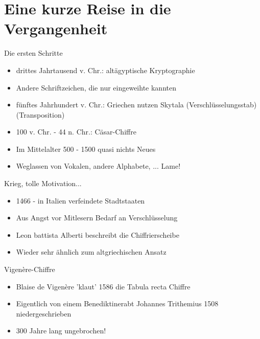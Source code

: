 \section{Eine kurze Reise in die Vergangenheit}
  \begin{frame}{Die ersten Schritte}
    \begin{itemize}
      \item{drittes Jahrtausend v. Chr.: altägyptische Kryptographie}
      \item{Andere Schriftzeichen, die nur eingeweihte kannten}
      \item{fünftes Jahrhundert v. Chr.: Griechen nutzen Skytala (Verschlüsselungsstab) (Transposition)}
      \item{100 v. Chr. - 44 n. Chr.: Cäsar-Chiffre}
      \item{Im Mittelalter 500 - 1500 quasi nichts Neues}
      \item{Weglassen von Vokalen, andere Alphabete, ... Lame!}
    \end{itemize}
  \end{frame}
  \begin{frame}{Krieg, tolle Motivation...}
    \begin{itemize}
      \item{1466 - in Italien verfeindete Stadtstaaten}
      \item{Aus Angst vor Mitlesern Bedarf an Verschlüsselung}
      \item{Leon battista Alberti beschreibt die Chiffrierscheibe}
      \item{Wieder sehr ähnlich zum altgriechischen Ansatz}
    \end{itemize}
  \end{frame}
  \begin{frame}{Vigenère-Chiffre}
    \begin{itemize}
      \item{Blaise de Vigenère 'klaut' 1586 die Tabula recta Chiffre}
      \item{Eigentlich von einem Benediktinerabt Johannes Trithemius 1508 niedergeschrieben}
      \item{300 Jahre lang ungebrochen!}
    \end{itemize}
  \end{frame}
